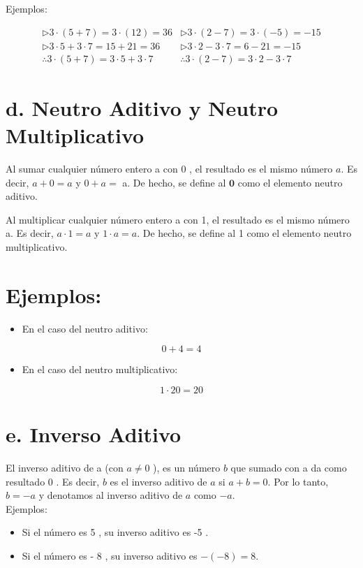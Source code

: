 \documentclass[10pt]{article}
\begin{document}
Ejemplos:

$$
\begin{array}{ll}
\triangleright 3 \cdot(5+7)=3 \cdot(12)=36 & \triangleright 3 \cdot(2-7)=3 \cdot(-5)=-15 \\
\triangleright 3 \cdot 5+3 \cdot 7=15+21=36 & \triangleright 3 \cdot 2-3 \cdot 7=6-21=-15 \\
\therefore 3 \cdot(5+7)=3 \cdot 5+3 \cdot 7 & \therefore 3 \cdot(2-7)=3 \cdot 2-3 \cdot 7
\end{array}
$$

\section*{d. Neutro Aditivo y Neutro Multiplicativo}
Al sumar cualquier número entero a con 0 , el resultado es el mismo número $a$. Es decir, $a+0=a$ y $0+a=$ a. De hecho, se define al $\mathbf{0}$ como el elemento neutro aditivo.

Al multiplicar cualquier número entero a con 1, el resultado es el mismo número a. Es decir, $a \cdot 1=a$ y $1 \cdot a=a$. De hecho, se define al 1 como el elemento neutro multiplicativo.

\section*{Ejemplos:}
\begin{itemize}
  \item En el caso del neutro aditivo:
\end{itemize}

$$
0+4=4
$$

\begin{itemize}
  \item En el caso del neutro multiplicativo:
\end{itemize}

$$
1 \cdot 20=20
$$

\section*{e. Inverso Aditivo}
El inverso aditivo de a (con $a \neq 0$ ), es un número $b$ que sumado con a da como resultado 0 . Es decir, $b$ es el inverso aditivo de $a$ si $a+b=0$. Por lo tanto, $b=-a$ y denotamos al inverso aditivo de $a$ como $-a$.\\
Ejemplos:

\begin{itemize}
  \item Si el número es 5 , su inverso aditivo es -5 .
  \item Si el número es - 8 , su inverso aditivo es $-(-8)=8$.
\end{itemize}
\end{document}
